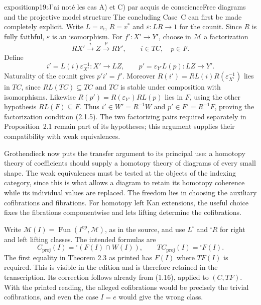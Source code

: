 \begin{dcomment}{exposition}{p19:J'ai noté les cas A) et C) par acquis de conscience}{Free diagrams and the projective model structure}
The concluding Case~C can first be made completely explicit. Write $L=v_!$, $R=v^*$ and $\varepsilon:LR\to1$ for the counit. Since $R$ is fully faithful, $\varepsilon$ is an isomorphism. For $f':X'\to Y'$, choose in $\mathcal M$ a factorization
\[
 R X'\xrightarrow{i}Z\xrightarrow{p}R Y',
 \qquad i\in TC,\quad p\in F.
\]
Define
\[
 i'=L(i)\varepsilon_{X'}^{-1}:X'\longrightarrow LZ,
 \qquad p'=\varepsilon_{Y'}L(p):LZ\longrightarrow Y'.
\]
Naturality of the counit gives $p'i'=f'$. Moreover $R(i')=RL(i)R(\varepsilon_{X'}^{-1})$ lies in $TC$, since $RL(TC)\subseteq TC$ and $TC$ is stable under composition with isomorphisms. Likewise $R(p')=R(\varepsilon_{Y'})RL(p)$ lies in $F$, using the other hypothesis $RL(F)\subseteq F$. Thus $i'\in W'=R^{-1}W$ and $p'\in F'=R^{-1}F$, proving the factorization condition (2.1.5). The two factorizing pairs required separately in Proposition~2.1 remain part of its hypotheses; this argument supplies their compatibility with weak equivalences.

Grothendieck now puts the transfer argument to its principal use: a homotopy theory of coefficients should supply a homotopy theory of diagrams of every small shape. The weak equivalences must be tested at the objects of the indexing category, since this is what allows a diagram to retain its homotopy coherence while its individual values are replaced. The freedom lies in choosing the auxiliary cofibrations and fibrations. For homotopy left Kan extensions, the useful choice fixes the fibrations componentwise and lets lifting determine the cofibrations.

Write $\mathcal M(I)=\operatorname{Fun}(I^{\mathrm{op}},\mathcal M)$, as in the source, and use $L^{\square}$ and ${}^{\square}R$ for right and left lifting classes. The intended formulas are
\[
 C_{\mathrm{proj}}(I)={}^{\square}(F(I)\cap W(I)),
 \qquad
 TC_{\mathrm{proj}}(I)={}^{\square}F(I).
\]
The first equality in Theorem 2.3 as printed has $F(I)$ where $TF(I)$ is required. This is visible in the edition and is therefore retained in the transcription. Its correction follows already from (1.16), applied to $(C,TF)$. With the printed reading, the alleged cofibrations would be precisely the trivial cofibrations, and even the case $I=e$ would give the wrong class.


\end{dcomment}
